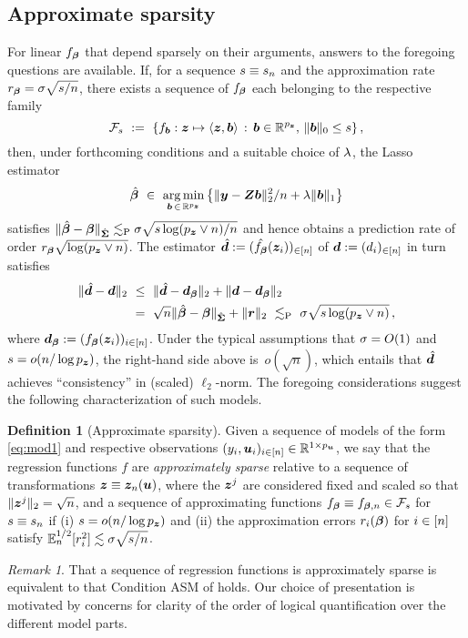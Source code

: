 \documentclass{uwstat572}
\newcommand{\benn}{\begin{equation*}}
\newcommand{\eenn}{\end{equation*}}
\theoremstyle{definition}
\newtheorem{defi}[thm]{Definition}
\theoremstyle{remark}
\newtheorem{rek}[thm]{Remark}
\newcommand{\R}{\ensuremath{\mathbb{R}}}
\newcommand{\Prb}{\mathrm{P}}
\newcommand{\Ex}{\mathbb{E}}
\newcommand{\Exn}{\Ex_n}
\DeclareMathOperator*{\argmin}{arg\,min}
\newcommand{\bs}[1]{\boldsymbol{#1}}
\numberwithin{equation}{section}
\begin{document}
\subsection{Approximate sparsity}

For linear $\fb$ that depend sparsely on their arguments, answers to the foregoing questions are available. If, for a sequence $\sb \equiv \sb_n$ and the approximation rate $\rb = \sd\sqrt{\sb/n}$, there exists a sequence of $\fb$ each belonging to the respective family
\benn%
	\fams \ := \ \{ f_{\bs{b}}: \z \mapsto \langle \z, \bs{b}\rangle \,:\, \bs{b} \in \R^{\pz},\, \|\bs{b}\|_0 \leq \sb \} \,,
\eenn
then, under forthcoming conditions and a suitable choice of $\tune$, the Lasso estimator
\benn
	\regbh \ \in \ \argmin_{\bs{b}\,\in\,\R^{\pz}} \big\{ \|\y - \Z\bs{b}\|_2^2/n + \tune\|\bs{b}\|_1 \big\}
\eenn
satisfies $\|\regbh - \regb\|_{\gramhat} \lesssim_\Prb \sd\sqrt{s\log(\pz\vee n)/n}$ and hence obtains a prediction rate of order $\rb\sqrt{\log(\pz\vee n)}$. The estimator $\dhat := (\fbhat(\z_i))_{\inn}$ of $\d := (d_i)_{\inn}$ in turn satisfies
\begin{align}
	\| \dhat -\d \|_2 \ & \leq \  \|\dhat - \db\|_2 + \| \d - \db \|_2 \nonumber\\
	& = \ \sqrt{n}\|\regbh - \regb\|_{\gramhat} + \|\rem\|_2 \ \lesssim_\Prb \ \sd\sqrt{\sb\log(\pz\vee n)} \,,
\end{align}
where $\db := (\fb(\z_i))_{i\inn}$. Under the typical assumptions that $\sd = O(1)$ and $\sb = o(n/\log\pz)$, the right-hand side above is~$o(\sqrt{n})$, which entails that $\dhat$ achieves ``consistency'' in (scaled) $\ell_2$-norm. The foregoing considerations suggest the following characterization of such models.

\begin{defi}[Approximate sparsity] Given a sequence of models of the form \eqref{eq:mod1} and respective observations $(y_i, \u_i)_{i\inn} \in \R^{1\times\pu}$, we say that the regression functions $f$ are \emph{approximately sparse} relative to a sequence of transformations $\z \equiv \z_n(\u)$, where the $\z^j$ are considered fixed and scaled so that $\|\z^j\|_2 = \sqrt{n}$, and a sequence of approximating functions $\fb \equiv \fbn \in \fams$ for $\sb \equiv \sb_n$ if (i) $\sb = o(n/\log\pz)$ and (ii) the approximation errors $\remi(\regb)$ for $i\inn$ satisfy $\Exn^{1/2}[\remi^2] \lesssim \sd\sqrt{\sb/n}$.
\end{defi}

\begin{rek} That a sequence of regression functions is approximately sparse is equivalent to that Condition ASM of \cite{BCH11} holds. Our choice of presentation is motivated by concerns for clarity of the order of logical quantification over the different model parts. 
\end{rek}
\end{document}
